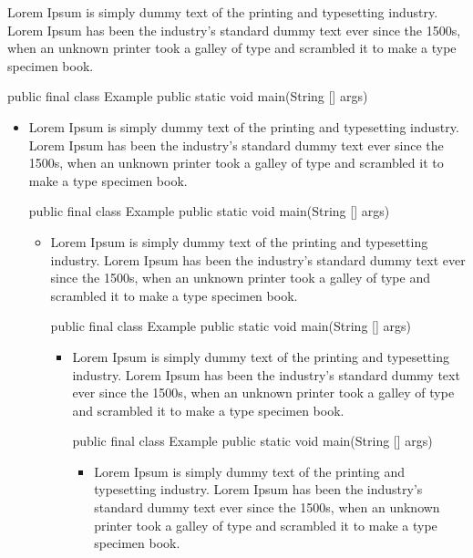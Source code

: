 \documentclass[polish]{article}
\begin{document}
% 
%
\noindent Lorem Ipsum is simply dummy text of the printing and typesetting industry. Lorem Ipsum has been the industry's standard  dummy text ever since the 1500s, when an unknown printer took a galley of type and scrambled it to make a type specimen book.
\begin{codeblock}
public final class Example {
	public static void main(String [] args) {
	}
}
\end{codeblock}


\begin{itemize}
	\item Lorem Ipsum is simply dummy text of the printing and typesetting industry. Lorem Ipsum has been the industry's standard  dummy text ever since the 1500s, when an unknown printer took a galley of type and scrambled it to make a type specimen book.
\begin{codeblock}
public final class Example {
	public static void main(String [] args) {
	}
}
\end{codeblock}

	\begin{itemize}
		\item Lorem Ipsum is simply dummy text of the printing and typesetting industry. Lorem Ipsum has been the industry's standard  dummy text ever since the 1500s, when an unknown printer took a galley of type and scrambled it to make a type specimen book.
\begin{codeblock}
public final class Example {
	public static void main(String [] args) {
	}
}
\end{codeblock}

		\begin{itemize}
			\item Lorem Ipsum is simply dummy text of the printing and typesetting industry. Lorem Ipsum has been the industry's standard  dummy text ever since the 1500s, when an unknown printer took a galley of type and scrambled it to make a type specimen book.
\begin{codeblock}
public final class Example {
	public static void main(String [] args) {
	}
}
\end{codeblock}

			\begin{itemize}
				\item Lorem Ipsum is simply dummy text of the printing and typesetting industry. Lorem Ipsum has been the industry's standard  dummy text ever since the 1500s, when an unknown printer took a galley of type and scrambled it to make a type specimen book.
			\end{itemize}
		\end{itemize}
	\end{itemize}
\end{itemize}
\end{document}
